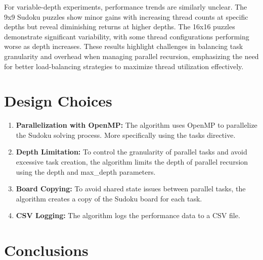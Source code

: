 \documentclass[a4paper,11pt]{article}
\begin{document}
For variable-depth experiments, performance trends are similarly unclear. The 9x9 Sudoku puzzles show minor gains with increasing thread counts at specific depths but reveal diminishing returns at higher depths. The 16x16 puzzles demonstrate significant variability, with some thread configurations performing worse as depth increases. These results highlight challenges in balancing task granularity and overhead when managing parallel recursion, emphasizing the need for better load-balancing strategies to maximize thread utilization effectively.

\section{Design Choices}

\begin{enumerate}
    \item \textbf{Parallelization with OpenMP:} The algorithm uses OpenMP to parallelize the Sudoku solving process. More specifically using the tasks directive.
    \item \textbf{Depth Limitation:} To control the granularity of parallel tasks and avoid excessive task creation, the algorithm limits the depth of parallel recursion using the depth and max\_depth parameters.
    \item \textbf{Board Copying:} To avoid shared state issues between parallel tasks, the algorithm creates a copy of the Sudoku board for each task.
    \item \textbf{CSV Logging:} The algorithm logs the performance data to a CSV file.
\end{enumerate}

\section{Conclusions}

\end{document}

